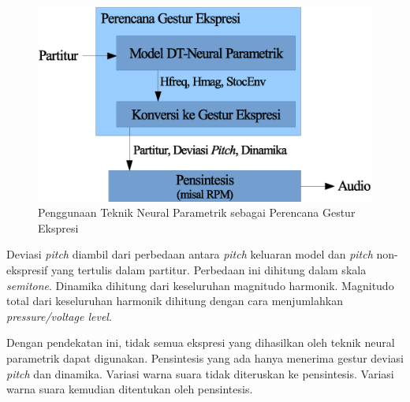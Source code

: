 \begin{figure}[htb]
  \centering
  \includegraphics[width=\textwidth]{resources/DTNP-as-gesture-planner.eps}
  \caption{Penggunaan Teknik Neural Parametrik sebagai Perencana Gestur Ekspresi}\label{fig-dtnp-as-gesture-planner}
\end{figure}

Deviasi \textit{pitch} diambil dari perbedaan antara \textit{pitch} keluaran model dan \textit{pitch} non-ekspresif yang tertulis dalam partitur. Perbedaan ini dihitung dalam skala \textit{semitone}. Dinamika dihitung dari keseluruhan magnitudo harmonik. Magnitudo total dari keseluruhan harmonik dihitung dengan cara menjumlahkan \textit{pressure/voltage level}.

Dengan pendekatan ini, tidak semua ekspresi yang dihasilkan oleh teknik neural parametrik dapat digunakan. Pensintesis yang ada hanya menerima gestur deviasi \textit{pitch} dan dinamika. Variasi warna suara tidak diteruskan ke pensintesis. Variasi warna suara kemudian ditentukan oleh pensintesis.
